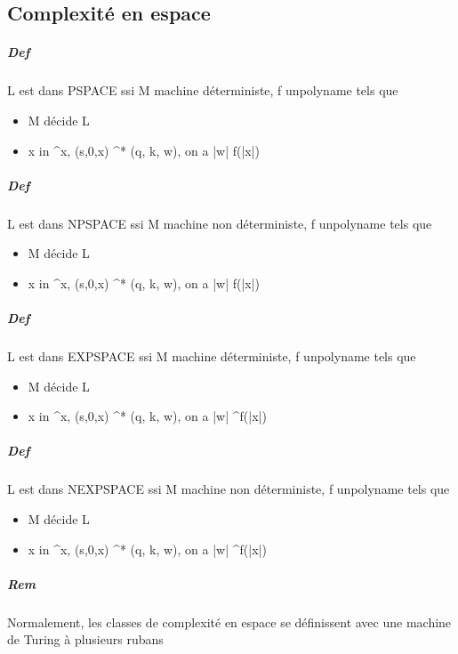 \documentclass[10pt,a4paper]{article}
\begin{document}
\subsection{Complexité en espace}
\subparagraph*{Def} L est dans PSPACE ssi \exists M machine déterministe, f unpolyname tels que \begin{itemize}
\item M décide L
\item \forall x in \Sigma^x, (s,0,x) \rightarrow^* (q, k, w), on a |w| \leq f(|x|)
\end{itemize}
\subparagraph*{Def} L est dans NPSPACE ssi \exists M machine non déterministe, f unpolyname tels que \begin{itemize}
\item M décide L
\item \forall x in \Sigma^x, (s,0,x) \rightarrow^* (q, k, w), on a |w| \leq f(|x|)
\end{itemize}
\subparagraph*{Def} L est dans EXPSPACE ssi \exists M machine déterministe, f unpolyname tels que \begin{itemize}
\item M décide L
\item \forall x in \Sigma^x, (s,0,x) \rightarrow^* (q, k, w), on a |w| ^{f(|x|)}
\end{itemize}
\subparagraph*{Def} L est dans NEXPSPACE ssi \exists M machine non déterministe, f unpolyname tels que \begin{itemize}
\item M décide L
\item \forall x in \Sigma^x, (s,0,x) \rightarrow^* (q, k, w), on a |w| ^{f(|x|)}
\end{itemize}
\subparagraph*{Rem} Normalement, les classes de complexité en espace se définissent avec une machine de Turing à plusieurs rubans
\end{document}
